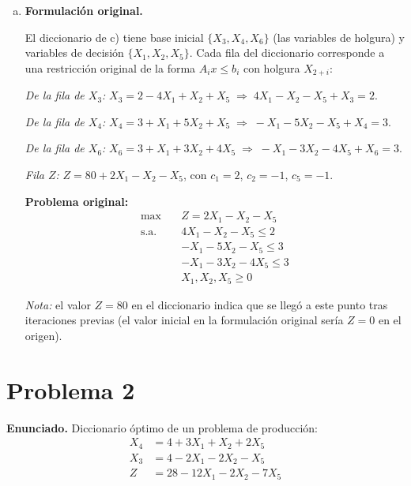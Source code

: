 \documentclass{article}
\begin{document}
\begin{enumerate}[a)]
\textit{Verificación:} todos los costos reducidos son $-1/2<0$ $\Rightarrow$ \textbf{óptimo}. SBF: $X_1=1/2>0$, $X_4=7/2>0$, $X_6=7/2>0$ (no degenerada). $Z^*=81$.

\item \textbf{Formulación original.}

El diccionario de c) tiene base inicial $\{X_3,X_4,X_6\}$ (las variables de holgura) y variables de decisión $\{X_1,X_2,X_5\}$. Cada fila del diccionario corresponde a una restricción original de la forma $A_i x \leq b_i$ con holgura $X_{2+i}$:

\textit{De la fila de $X_3$:} $X_3 = 2 - 4X_1 + X_2 + X_5 \;\Rightarrow\; 4X_1 - X_2 - X_5 + X_3 = 2$.

\textit{De la fila de $X_4$:} $X_4 = 3 + X_1 + 5X_2 + X_5 \;\Rightarrow\; -X_1 - 5X_2 - X_5 + X_4 = 3$.

\textit{De la fila de $X_6$:} $X_6 = 3 + X_1 + 3X_2 + 4X_5 \;\Rightarrow\; -X_1 - 3X_2 - 4X_5 + X_6 = 3$.

\textit{Fila $Z$:} $Z = 80 + 2X_1 - X_2 - X_5$, con $c_1=2$, $c_2=-1$, $c_5=-1$.

\textbf{Problema original:}
$$\begin{aligned}
\max\quad & Z = 2X_1 - X_2 - X_5 \\
\text{s.a.}\quad
& 4X_1 - X_2 - X_5 \leq 2 \\
& -X_1 - 5X_2 - X_5 \leq 3 \\
& -X_1 - 3X_2 - 4X_5 \leq 3 \\
& X_1,X_2,X_5 \geq 0
\end{aligned}$$

\textit{Nota:} el valor $Z=80$ en el diccionario indica que se llegó a este punto tras iteraciones previas (el valor inicial en la formulación original sería $Z=0$ en el origen).

\end{enumerate}

\newpage
\section*{Problema 2}

\textbf{Enunciado.} Diccionario óptimo de un problema de producción:
$$\begin{aligned}
X_4 &= 4 + 3X_1 + X_2 + 2X_5 \\
X_3 &= 4 - 2X_1 - 2X_2 - X_5 \\
Z   &= 28 - 12X_1 - 2X_2 - 7X_5
\end{aligned}$$
\end{document}

